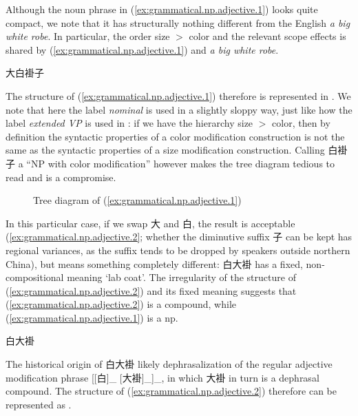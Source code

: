 \documentclass[UTF8, a4paper, oneside, scheme=plain, 12pt]{ctexrep}
\newcommand*{\textgt}{$>$ }
\newcommand*{\term}[1]{\emph{#1}}
\newcommand{\form}[1]{\emph{#1}}
\newcommand{\translate}[1]{`#1'}
\begin{document}
Although the noun phrase in (\ref{ex:grammatical.np.adjective.1}) looks quite compact,
we note that it has structurally nothing different from the English \form{a big white robe}.
In particular, the order size \textgt{}color and the relevant scope effects is shared
by (\ref{ex:grammatical.np.adjective.1}) and \form{a big white robe}.

\begin{exe}
    \ex\label{ex:grammatical.np.adjective.1} 大白褂子
\end{exe}

The structure of (\ref{ex:grammatical.np.adjective.1}) therefore is represented in 
.
We note that here the label \term{nominal} is used in a slightly sloppy way,
just like how the label \term{extended VP} is used in :
if we have the hierarchy size \textgt{}color,
then by definition the syntactic properties of a color modification construction
is not the same as the syntactic properties of a size modification construction.
Calling 白褂子 a ``NP with color modification'' however makes the tree diagram tedious to read
and  is a compromise.

\begin{figure}[H]
    \centering
    {
        \small
        
    }
    \caption{Tree diagram of (\ref{ex:grammatical.np.adjective.1})}
    \label{fig:grammatical.np.adjective.1}
\end{figure}

In this particular case, 
if we swap 大 and 白, the result is acceptable (\ref{ex:grammatical.np.adjective.2};
whether the diminutive suffix 子 can be kept has regional variances,
as the suffix tends to be dropped by speakers outside northern China),
but means something completely different:
白大褂 has a fixed, non-compositional meaning \translate{lab coat}.
The irregularity of the structure of (\ref{ex:grammatical.np.adjective.2})
and its fixed meaning suggests that (\ref{ex:grammatical.np.adjective.2}) is a compound,
while (\ref{ex:grammatical.np.adjective.1}) is a \ac{np}.

\begin{exe}
    \ex\label{ex:grammatical.np.adjective.2} 白大褂
\end{exe}

The historical origin of 白大褂 likely dephrasalization of the regular adjective modification phrase [[白]_{} [大褂]_{}]_{},
in which 大褂 in turn is a dephrasal compound.
The structure of (\ref{ex:grammatical.np.adjective.2})
therefore can be represented as .
\end{document}
